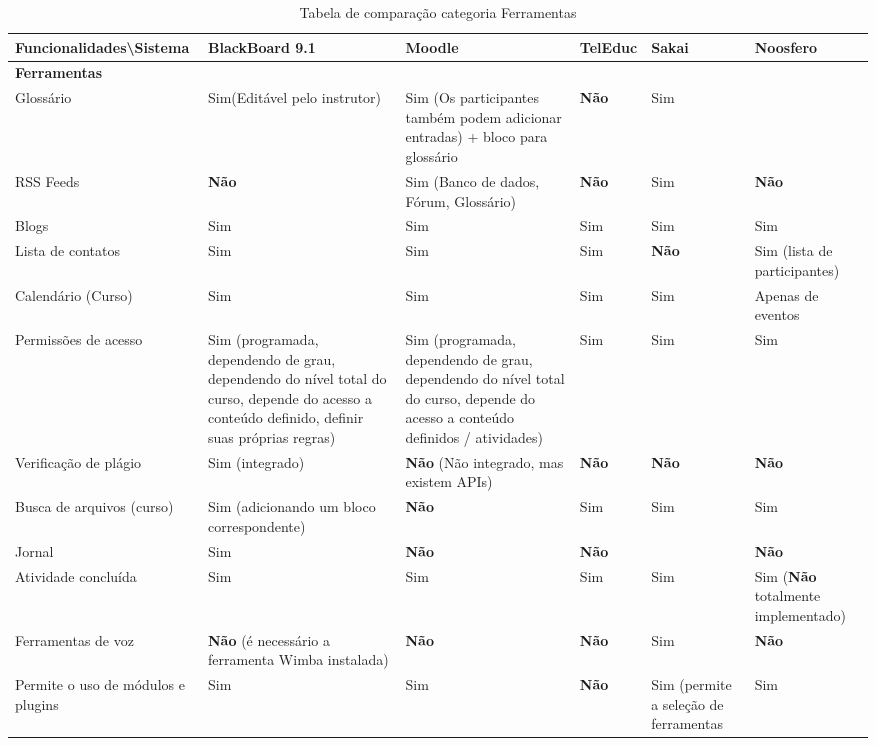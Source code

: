 \begin{landscape}
\begin{table}[H]
\begin{tabular}{|@{}p{5.5cm}|p{3.5cm}|p{3.5cm}|p{3.5cm}|p{3.5cm}|p{3.5cm}@{}|}
\hline
\textbf{Funcionalidades\textbackslash Sistema} & \textbf{BlackBoard 9.1} & \textbf{Moodle} & \textbf{TelEduc} & \textbf{Sakai} & \textbf{Noosfero}\\ \hline
\textbf{Ferramentas} &  &  &  &  &  \\
Glossário & Sim(Editável pelo instrutor) & Sim {\tiny (Os participantes também podem adicionar entradas) + bloco para glossário} & \textbf{Não}  & Sim &  \\
RSS Feeds & \textbf{Não}  & Sim {\tiny (Banco de dados, Fórum, Glossário)} & \textbf{Não}  & Sim & \textbf{Não}  \\
Blogs & Sim & Sim & Sim & Sim & Sim \\
Lista de contatos & Sim & Sim & Sim & \textbf{Não}  & Sim {\tiny (lista de participantes)}\\
Calendário (Curso) & Sim & Sim & Sim & Sim & {\tiny Apenas de eventos} \\
Permissões de acesso & Sim {\tiny (programada, dependendo de grau, dependendo do nível total do curso, depende do acesso a conteúdo definido, definir suas próprias regras)} & Sim \tiny{(programada, dependendo de grau, dependendo do nível total do curso, depende do acesso a conteúdo definidos / atividades)} & Sim & Sim & Sim \\
Verificação de plágio & Sim {\tiny (integrado)} & \textbf{Não}  {\tiny (Não integrado, mas existem APIs)} & \textbf{Não}  & \textbf{Não}  & \textbf{Não}  \\
Busca de arquivos (curso) & Sim {\tiny (adicionando um bloco correspondente)} & \textbf{Não}  & Sim & Sim & Sim \\
Jornal & Sim & \textbf{Não}  & \textbf{Não}  &  & \textbf{Não}  \\
Atividade concluída & Sim & Sim & Sim & Sim & Sim {\tiny (\textbf{Não}  totalmente implementado)} \\
Ferramentas de voz & \textbf{Não}  (é necessário a ferramenta Wimba instalada) & \textbf{Não}  & \textbf{Não}  & Sim & \textbf{Não}  \\
Permite o uso de módulos e plugins & Sim & Sim & \textbf{Não}  & Sim {\tiny (permite a seleção de ferramentas} & Sim \\ \hline
\end{tabular}
\caption{Tabela de comparação categoria Ferramentas}
\label{tab:ferramentas}
\end{table}


\end{landscape}
